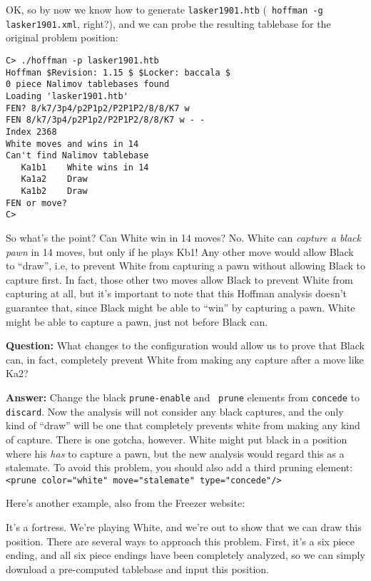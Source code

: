 \documentclass[11pt]{article}
\begin{document}
OK, so by now we know how to generate {\tt lasker1901.htb} ({\tt
hoffman -g lasker1901.xml}, right?), and we can probe the resulting
tablebase for the original problem position:

\begin{verbatim}
C> ./hoffman -p lasker1901.htb
Hoffman $Revision: 1.15 $ $Locker: baccala $
0 piece Nalimov tablebases found
Loading 'lasker1901.htb'
FEN? 8/k7/3p4/p2P1p2/P2P1P2/8/8/K7 w
FEN 8/k7/3p4/p2P1p2/P2P1P2/8/8/K7 w - -
Index 2368
White moves and wins in 14
Can't find Nalimov tablebase
   Ka1b1    White wins in 14
   Ka1a2    Draw
   Ka1b2    Draw
FEN or move?
C>
\end{verbatim}

So what's the point?  Can White win in 14 moves?  No.  White can {\it
capture a black pawn} in 14 moves, but only if he plays Kb1!  Any
other move would allow Black to ``draw'', i.e, to prevent White from
capturing a pawn without allowing Black to capture first.  In fact,
those other two moves allow Black to prevent White from capturing at
all, but it's important to note that this Hoffman analysis doesn't
guarantee that, since Black might be able to ``win'' by capturing a
pawn.  White might be able to capture a pawn, just not before Black
can.

{\bf Question:} What changes to the configuration would allow us to
prove that Black can, in fact, completely prevent White from making
any capture after a move like Ka2?

{\bf Answer:} Change the black {\tt prune-enable} and {\tt
prune} elements from {\tt concede} to {\tt discard}.  Now the analysis
will not consider any black captures, and the only kind of ``draw''
will be one that completely prevents white from making any kind of
capture.  There is one gotcha, however.  White might put black in a
position where his {\it has} to capture a pawn, but the new analysis
would regard this as a stalemate.  To avoid this problem, you should
also add a third pruning element: {\tt <prune color="white"
move="stalemate" type="concede"/>}

Here's another example, also from the Freezer website:

\showboard

It's a fortress.  We're playing White, and we're out to show that we
can draw this position.  There are several ways to approach this
problem.  First, it's a six piece ending, and all six piece endings
have been completely analyzed, so we can simply download a
pre-computed tablebase and input this position.
\end{document}
